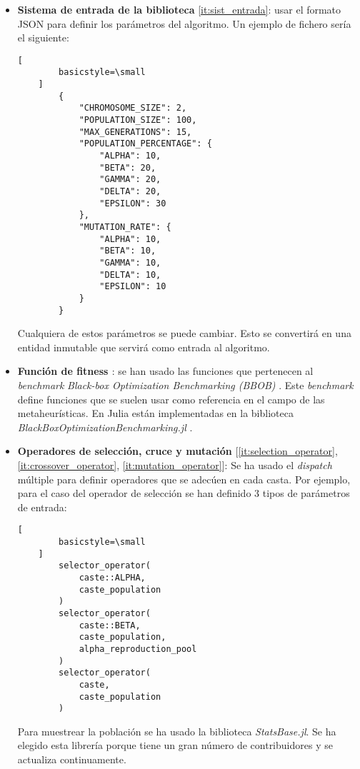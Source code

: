 \begin{itemize}
    \item \textbf{Sistema de entrada de la biblioteca} \ref{it:sist_entrada}: usar el formato JSON para definir los parámetros
    del algoritmo. Un ejemplo de fichero sería el siguiente:
    \begin{lstlisting}[
        basicstyle=\small
    ]
        {
            "CHROMOSOME_SIZE": 2,
            "POPULATION_SIZE": 100,
            "MAX_GENERATIONS": 15,
            "POPULATION_PERCENTAGE": {
                "ALPHA": 10,
                "BETA": 20,
                "GAMMA": 20,
                "DELTA": 20,
                "EPSILON": 30
            },
            "MUTATION_RATE": {
                "ALPHA": 10,
                "BETA": 10,
                "GAMMA": 10,
                "DELTA": 10,
                "EPSILON": 10
            }
        }
    \end{lstlisting}

    Cualquiera de estos parámetros se puede cambiar. Esto se convertirá en una entidad inmutable que servirá como 
    entrada al algoritmo.

    \item \textbf{Función de fitness \cite{project_repository_8}}: se han usado las funciones que pertenecen al \emph{benchmark}
    \emph{ Black-box Optimization Benchmarking (BBOB)} \cite{bbob_definition}. Este \emph{benchmark} define funciones que se suelen 
    usar como referencia en el campo de las metaheurísticas. En Julia están implementadas en la biblioteca 
    \emph{BlackBoxOptimizationBenchmarking.jl} \cite{bbob_jl}.

    \item \textbf{Operadores de selección, cruce y mutación} [\ref{it:selection_operator}, \ref{it:crossover_operator}, \ref{it:mutation_operator}]:
    Se ha usado el \emph{dispatch} múltiple para definir operadores que se adecúen en cada casta. Por ejemplo, para el caso del
    operador de selección se han definido 3 tipos de parámetros de entrada:

    \begin{lstlisting}[
        basicstyle=\small
    ]
        selector_operator(
            caste::ALPHA, 
            caste_population
        )
        selector_operator(
            caste::BETA, 
            caste_population, 
            alpha_reproduction_pool
        )
        selector_operator(
            caste, 
            caste_population
        )
    \end{lstlisting}
    
    Para muestrear la población se ha usado la biblioteca \emph{StatsBase.jl}. Se ha elegido esta librería porque
    tiene un gran número de contribuidores y se actualiza continuamente.
\end{itemize}

